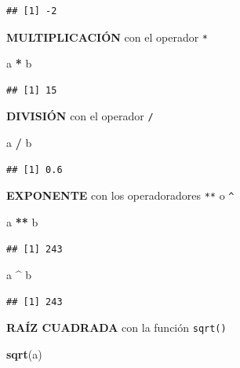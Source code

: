 \documentclass[
]{book}
\newenvironment{Shaded}{\begin{snugshade}}{\end{snugshade}}
\newcommand{\FunctionTok}[1]{\textcolor[rgb]{0.13,0.29,0.53}{\textbf{#1}}}
\newcommand{\NormalTok}[1]{#1}
\newcommand{\SpecialCharTok}[1]{\textcolor[rgb]{0.81,0.36,0.00}{\textbf{#1}}}
\begin{document}
\begin{verbatim}
## [1] -2
\end{verbatim}

\textbf{MULTIPLICACIÓN} con el operador \texttt{*}

\begin{Shaded}
\begin{Highlighting}[]
\NormalTok{a }\SpecialCharTok{*}\NormalTok{ b}
\end{Highlighting}
\end{Shaded}

\begin{verbatim}
## [1] 15
\end{verbatim}

\textbf{DIVISIÓN} con el operador \texttt{/}

\begin{Shaded}
\begin{Highlighting}[]
\NormalTok{a }\SpecialCharTok{/}\NormalTok{ b}
\end{Highlighting}
\end{Shaded}

\begin{verbatim}
## [1] 0.6
\end{verbatim}

\textbf{EXPONENTE} con los operadoradores \texttt{**} o \texttt{\^{}}

\begin{Shaded}
\begin{Highlighting}[]
\NormalTok{a }\SpecialCharTok{**}\NormalTok{ b}
\end{Highlighting}
\end{Shaded}

\begin{verbatim}
## [1] 243
\end{verbatim}

\begin{Shaded}
\begin{Highlighting}[]
\NormalTok{a }\SpecialCharTok{\^{}}\NormalTok{ b}
\end{Highlighting}
\end{Shaded}

\begin{verbatim}
## [1] 243
\end{verbatim}

\textbf{RAÍZ CUADRADA} con la función \texttt{sqrt()}

\begin{Shaded}
\begin{Highlighting}[]
\FunctionTok{sqrt}\NormalTok{(a)}
\end{Highlighting}
\end{Shaded}
\end{document}
